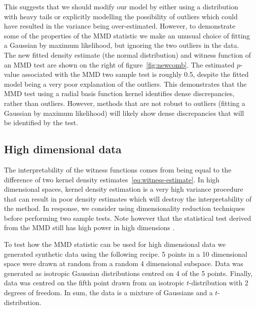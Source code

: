 This suggests that we should modify our model by either using a distribution with heavy tails or explicitly modelling the possibility of outliers which could have resulted in the variance being over-estimated.
However, to demonstrate some of the properties of the MMD statistic we make an unusual choice of fitting a Gaussian by maximum likelihood, but ignoring the two outliers in the data.
The new fitted density estimate (the normal distribution) and witness function of an MMD test are shown on the right of figure~\ref{fig:newcomb}.
The estimated $p$-value associated with the MMD two sample test is roughly 0.5, despite the fitted model being a very poor explanation of the outliers.
This demonstrates that the MMD test using a radial basis function kernel identifies dense discrepancies, rather than outliers.
However, methods that are not robust to outliers (\eg fitting a Gaussian by maximum likelihood) will likely show dense discrepancies that will be identified by the test.

\subsection{High dimensional data}

\label{sec:high_dim}

The interpretability of the witness functions comes from being equal to the difference of two kernel density estimates~\eqref{eq:witness-estimate}.
In high dimensional spaces, kernel density estimation is a very high variance procedure that can result in poor density estimates which will destroy the interpretability of the method.
In response, we consider using dimensionality reduction techniques before performing two sample tests.
Note however that the statistical test derived from the MMD still has high power in high dimensions \citep{Gretton2008-gs}.

To test how the MMD statistic can be used for high dimensional data we generated synthetic data using the following recipe.
5 points in a 10 dimensional space were drawn at random from a random 4 dimensional subspace\footnotemark.
Data was generated as isotropic Gaussian distributions centred on 4 of the 5 points.
Finally, data was centred on the fifth point drawn from an isotropic $t$-distribution with 2 degrees of freedom.
In sum, the data is a mixture of Gaussians and a $t$-distribution.

